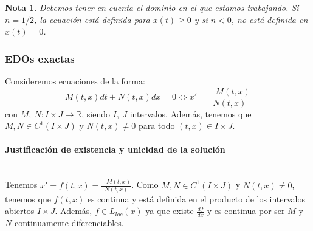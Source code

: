\documentclass[11pt]{article}
\theoremstyle{theorem-style}  %
\theoremstyle{definition-style}
\newtheorem*{note}{Nota} %
\theoremstyle{example-style}
\begin{document}
\begin{note}
	Debemos tener en cuenta el dominio en el que estamos trabajando. Si $ n=1/2 $, la ecuación está definida para $ x(t)\geq 0 $ y si $ n<0 $, no está definida en $ x(t)=0 $.
\end{note}

\subsubsection{EDOs exactas}
	Consideremos ecuaciones de la forma:
	\begin{equation} \label{eqEx}
	M(t, x)dt + N(t, x)dx = 0 \Leftrightarrow x'=\frac{-M(t, x)}{N(t, x)}
	\end{equation}
	con $M, \ N: I \times J \longrightarrow \mathbb{R}$, siendo $I, \ J$ intervalos. Además, tenemos que $M, N \in C^1(I\times J)$ y $N(t, x) \neq 0$ para todo $(t, x) \in I \times J$.
	
	\paragraph{Justificación de existencia y unicidad de la solución}\ \\
	Tenemos $ x'=f(t,x)= \frac{-M(t, x)}{N(t, x)}$. Como  $M, N \in C^1(I\times J)$ y $N(t, x) \neq 0$, tenemos que $ f(t,x) $ es continua y está definida en el producto de los intervalos abiertos $ I \times J $. Además, $ f\in L_{loc}(x) $ ya que existe $ \frac{df}{dx} $ y es continua por ser $ M $ y $ N $ continuamente diferenciables. 
	
\end{document}
